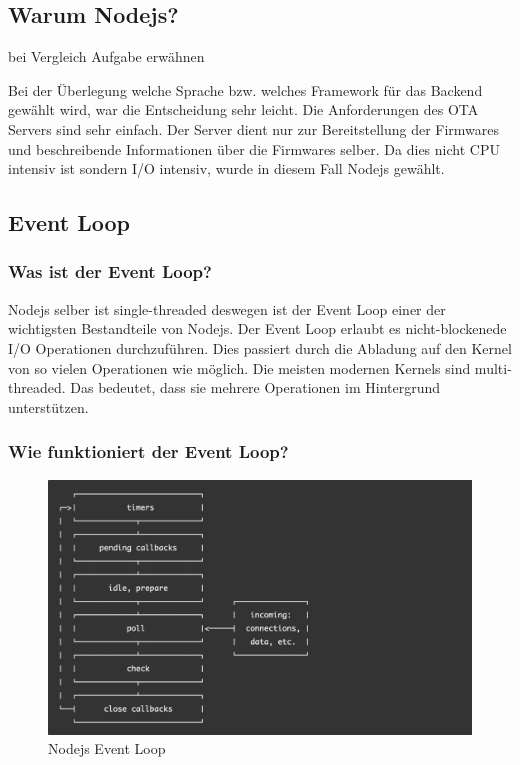 \subsection{Warum Nodejs?}
bei Vergleich Aufgabe erwähnen

Bei der Überlegung welche Sprache bzw. welches Framework für das Backend gewählt wird, war die Entscheidung sehr leicht.
Die Anforderungen des OTA Servers sind sehr einfach. Der Server dient nur zur Bereitstellung der Firmwares und beschreibende Informationen über die Firmwares selber.
Da dies nicht CPU intensiv ist sondern I/O intensiv, wurde in diesem Fall Nodejs gewählt.

\subsection{Event Loop}

\subsubsection{Was ist der Event Loop?}

Nodejs selber ist single-threaded deswegen ist der Event Loop einer der wichtigsten Bestandteile von Nodejs.
Der Event Loop erlaubt es nicht-blockenede I/O Operationen durchzuführen. Dies passiert durch die Abladung auf den Kernel von so vielen Operationen wie möglich.
\newline
\newline
Die meisten modernen Kernels sind multi-threaded. Das bedeutet, dass sie mehrere Operationen im Hintergrund unterstützen.

\subsubsection{Wie funktioniert der Event Loop?}

\begin{figure}[H]
    \begin{center}
        \includegraphics[scale=0.5]{images/nodejs_event_loop.png}
        \caption{Nodejs Event Loop \cite{nodejs_event_loop}}
    \end{center}
\end{figure}

